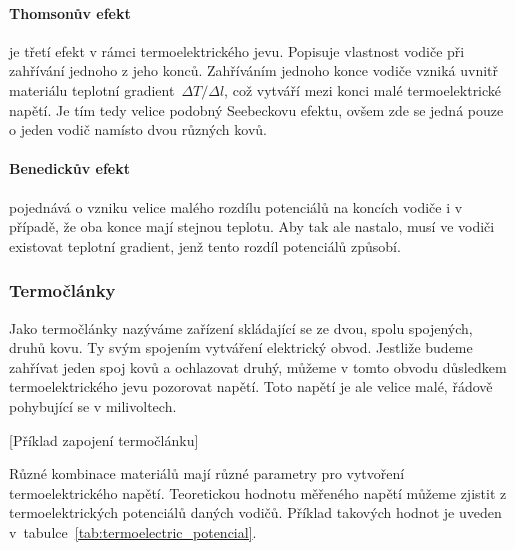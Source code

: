 \paragraph{Thomsonův efekt} je třetí efekt v rámci termoelektrického jevu.
Popisuje vlastnost vodiče při zahřívání jednoho z jeho konců. Zahříváním
jednoho konce vodiče vzniká uvnitř materiálu teplotní gradient~$\Delta T/\Delta l$, 
což vytváří mezi konci malé termoelektrické napětí. Je tím tedy velice
podobný Seebeckovu efektu, ovšem zde se jedná pouze o jeden vodič namísto dvou
různých kovů.~\cite{jreichl-thomson}

\paragraph{Benedickův efekt} pojednává o vzniku velice malého rozdílu
potenciálů na koncích vodiče i v případě, že oba konce mají stejnou teplotu.
Aby tak ale nastalo, musí ve vodiči existovat teplotní gradient, jenž tento
rozdíl potenciálů způsobí.~\cite{diplomka} 

\subsubsection{Termočlánky}
Jako termočlánky nazýváme zařízení skládající se ze dvou, spolu spojených,
druhů kovu. Ty svým spojením vytváření elektrický obvod. Jestliže budeme
zahřívat jeden spoj kovů a ochlazovat druhý, můžeme v tomto obvodu důsledkem
termoelektrického jevu pozorovat napětí. Toto napětí je ale velice malé, řádově
pohybující se v milivoltech.

[Příklad zapojení
termočlánku]

Různé kombinace materiálů mají různé parametry pro vytvoření termoelektrického 
napětí. Teoretickou hodnotu měřeného napětí můžeme zjistit z termoelektrických
potenciálů daných vodičů. Příklad takových hodnot je uveden 
v~tabulce~\ref{tab:termoelectric_potencial}.


